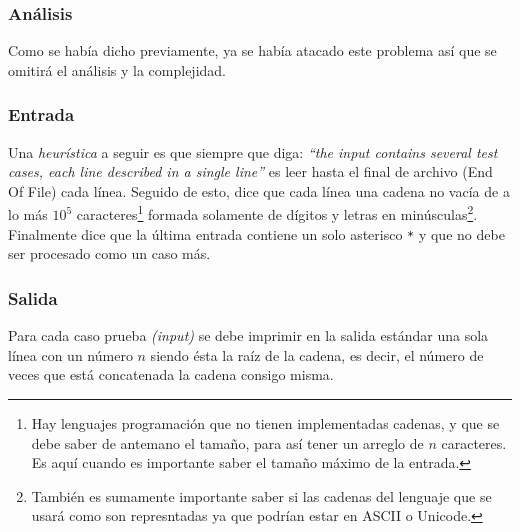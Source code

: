 \subsubsection{Análisis}
Como se había dicho previamente, ya se había atacado este problema así que se omitirá el análisis
y la complejidad.

\subsubsection{Entrada}
Una \textit{heurística} a seguir es que siempre que diga: \textit{``the input contains several test
cases, each line described in a single line''} es leer hasta el final de archivo (End Of File) cada
línea. Seguido de esto, dice que cada línea una cadena no vacía de a lo más $10^5$
caracteres\footnote{Hay lenguajes programación que no tienen implementadas cadenas, y que se debe
saber de antemano el tamaño, para así tener un arreglo de $n$ caracteres. Es aquí cuando es
importante saber el tamaño máximo de la entrada.} formada solamente de dígitos y letras en
minúsculas\footnote{También es sumamente importante saber si las cadenas del lenguaje que se usará
como son represntadas ya que podrían estar en ASCII o Unicode.}.
Finalmente dice que la última entrada contiene un solo asterisco \texttt{*} y que no debe ser
procesado como un caso más.

\subsubsection{Salida}
Para cada caso prueba \textit{(input)} se debe imprimir en la salida estándar una sola línea con un
número $n$ siendo ésta la raíz de la cadena, es decir, el número de veces que está concatenada la
cadena consigo misma.

